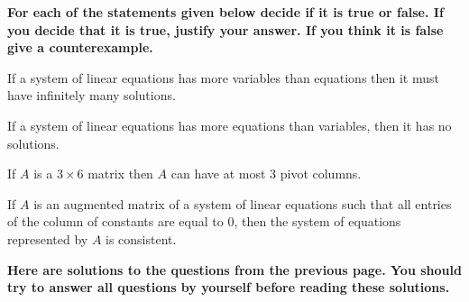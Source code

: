 \newpage

{\bf For each of the statements given below decide if it is true or false. If you decide that it is true, justify your answer. 
If you think it is false give a counterexample. }

\vskip 10mm

\benu
\item[\bf a)] If a system of linear equations has more variables than equations then it must have infinitely many solutions. 

\vskip 10mm

\item[\bf b)] If a system of linear equations has more equations  than variables, then it has no solutions. 

\vskip 10mm

\item[\bf c)] If $A$ is a  $3\times 6$  matrix then $A$ can have at most 3 pivot columns.  


\vskip 10mm

\item[\bf d)] If $A$ is an augmented matrix of a system of linear equations such that all entries of the column 
of constants are equal to 0, then the system of equations represented by $A$ is consistent.   


\eenu


\newpage

{\bf Here are solutions to the questions from the previous page. You should try to answer all 
questions by yourself before reading these solutions.}

\vskip 5mm 

